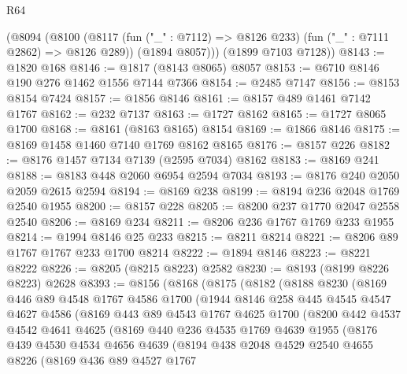 \begin{lexlean}{R64}
\begin{coremodule}
      (@8094
        (@8100
          (@8117 (fun ("_" : @7112) => @8126 @233) (fun ("_" : @7111 @2862) => @8126 @289))
          (@1894 @8057)))
      (@1899 @7103 @7128))
@8143 := @1820 @168
@8146 := @1817 (@8143 @8065) @8057
@8153 := @6710 @8146 @190 @276 @1462 @1556 @7144 @7366
@8154 := @2485 @7147
@8156 := @8153 @8154 @7424
@8157 := @1856 @8146
@8161 := @8157 @489 @1461 @7142 @1767
@8162 := @232 @7137
@8163 := @1727 @8162
@8165 := @1727 @8065 @1700
@8168 := @8161 (@8163 @8165) @8154
@8169 := @1866 @8146
@8175 := @8169 @1458 @1460 @7140 @1769 @8162 @8165
@8176 := @8157 @226
@8182 := @8176 @1457 @7134 @7139 (@2595 @7034) @8162
@8183 := @8169 @241
@8188 := @8183 @448 @2060 @6954 @2594 @7034
@8193 := @8176 @240 @2050 @2059 @2615 @2594
@8194 := @8169 @238
@8199 := @8194 @236 @2048 @1769 @2540 @1955
@8200 := @8157 @228
@8205 := @8200 @237 @1770 @2047 @2558 @2540
@8206 := @8169 @234
@8211 := @8206 @236 @1767 @1769 @233 @1955
@8214 := @1994 @8146 @25 @233
@8215 := @8211 @8214
@8221 := @8206 @89 @1767 @1767 @233 @1700 @8214
@8222 := @1894 @8146
@8223 := @8221 @8222
@8226 := @8205 (@8215 @8223) @2582
@8230 := @8193 (@8199 @8226 @8223) @2628
@8393 := @8156
    (@8168
      (@8175
        (@8182
          (@8188
            @8230
            (@8169
              @446
              @89
              @4548
              @1767
              @4586
              @1700
              (@1944
                @8146
                @258
                @445
                @4545
                @4547
                @4627
                @4586
                (@8169
                  @443
                  @89
                  @4543
                  @1767
                  @4625
                  @1700
                  (@8200
                    @442
                    @4537
                    @4542
                    @4641
                    @4625
                    (@8169
                      @440
                      @236
                      @4535
                      @1769
                      @4639
                      @1955
                      (@8176
                        @439
                        @4530
                        @4534
                        @4656
                        @4639
                        (@8194
                          @438
                          @2048
                          @4529
                          @2540
                          @4655
                          @8226
                          (@8169
                            @436
                            @89
                            @4527
                            @1767

\end{coremodule}
\end{lexlean}
